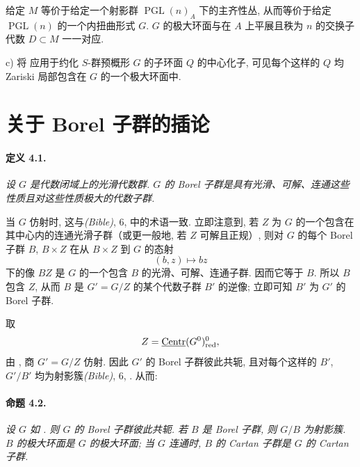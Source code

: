 给定 \(M\) 等价于给定一个射影群 \(\operatorname{PGL}(n)_A\) 下的主齐性丛, 从而等价于给定 \(\operatorname{PGL}(n)\) 的一个内扭曲形式 \(G\). \(G\) 的极大环面与在 \(A\) 上平展且秩为 \(n\) 的交换子代数 \(D\subset M\) 一一对应.

\smallskip
\noindent
\textup{c)}
将  应用于约化 \(S\)-群预概形 \(G\) 的子环面 \(Q\) 的中心化子, 可见每个这样的 \(Q\) 均 Zariski 局部包含在 \(G\) 的一个极大环面中.



\section{关于 Borel 子群的插论}

\paragraph{\textbf{定义 4.1.}}
{\itshape 设 \(G\) 是代数闭域上的光滑代数群. \(G\) 的 \emph{Borel 子群}是具有光滑、可解、连通这些性质且对这些性质极大的代数子群.}

当 \(G\) 仿射时, 这与\textup{\emph{(Bible)}, 6, } 中的术语一致. 立即注意到, 若 \(Z\) 为 \(G\) 的一个包含在其中心内的连通光滑子群\textup{（或更一般地, 若 \(Z\) 可解且正规）}, 则对 \(G\) 的每个 Borel 子群 \(B\), \(B\times Z\) 在从 \(B\times Z\) 到 \(G\) 的态射
\[
  (b,z)\longmapsto bz
\]
下的像 \(BZ\) 是 \(G\) 的一个包含 \(B\) 的光滑、可解、连通子群. 因而它等于 \(B\). 所以 \(B\) 包含 \(Z\), 从而 \(B\) 是 \(G'=G/Z\) 的某个代数子群 \(B'\) 的逆像; 立即可知 \(B'\) 为 \(G'\) 的 Borel 子群.

取
\[
  Z=\underline{\operatorname{Centr}}(G^0)_{\mathrm{red}}^0,
\]
由 , 商 \(G'=G/Z\) 仿射. 因此 \(G'\) 的 Borel 子群彼此共轭, 且对每个这样的 \(B'\), \(G'/B'\) 均为射影簇\textup{\emph{(Bible)}, 6, }. 从而:

\paragraph{\textbf{命题 4.2.}}
{\itshape 设 \(G\) 如 . 则 \(G\) 的 Borel 子群彼此共轭. 若 \(B\) 是 Borel 子群, 则 \(G/B\) 为射影簇. \(B\) 的极大环面是 \(G\) 的极大环面; 当 \(G\) 连通时, \(B\) 的 Cartan 子群是 \(G\) 的 Cartan 子群.}

